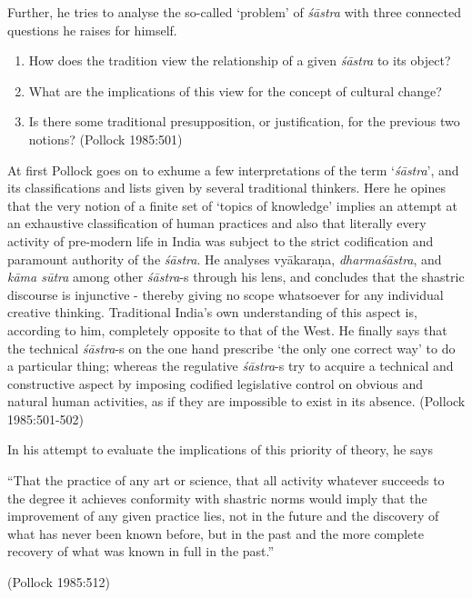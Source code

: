 Further, he tries to analyse the so-called `problem' of {\sl śāstra} with three connected questions he raises for himself.
\begin{enumerate}
\item How does the tradition view the relationship of a given {\sl śāstra} to its object?

\newpage

\item What are the implications of this view for the concept of cultural change?

\item Is there some traditional presupposition, or justification, for the previous two notions? (Pollock 1985:501)
\end{enumerate}

At first Pollock goes on to exhume a few interpretations of the term `{\it śāstra}', and its classifications and lists given by several traditional thinkers. Here he opines that the very notion of a finite set of `topics of knowledge' implies an attempt at an exhaustive classification of human practices and also that literally every activity of pre-modern life in India was subject to the strict codification and paramount authority of the {\it śāstra}. He analyses vyākaraṇa, {\sl dharmaśāstra}, and {\sl kāma sūtra} among other {\it śāstra}-s through his lens, and concludes that the shastric discourse is injunctive - thereby giving no scope whatsoever for any individual creative thinking. Traditional India's own understanding of this aspect is, according to him, completely opposite to that of the West. He finally says that the technical {\it śāstra}-s on the one hand prescribe `the only one correct way' to do a particular thing;  whereas the regulative {\it śāstra}-s try to acquire a technical and constructive aspect by imposing codified legislative control on obvious and natural human activities, as if they are impossible to exist in its absence. (Pollock 1985:501-502)

In his attempt to evaluate the implications of this priority of theory, he says
\begin{myquote}
``That the practice of any art or science, that all activity whatever succeeds to the degree it achieves conformity with shastric norms would imply that the improvement of any given practice lies, not in the future and the discovery of what has never been known before, but in the past and the more complete recovery of what was known in full in the past.'' 

\hfill (Pollock 1985:512)
\end{myquote}

